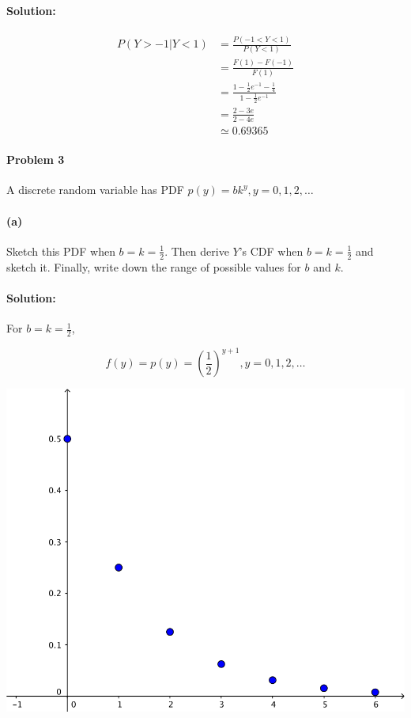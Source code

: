\documentclass[a4paper, 11pt, twoside]{article}
\begin{document}
\paragraph{Solution:}

\[
\begin{split}
	P(Y>-1|Y<1)&=\frac{P(-1<Y<1)}{P(Y<1)}\\
	&=\frac{F(1)-F(-1)}{F(1)}\\
	&=\frac{1-\frac{1}{2}e^{-1}-\frac{1}{4}}{1-\frac{1}{2}e^{-1}}\\
	&=\frac{2-3e}{2-4e}\\
	&\simeq 0.69365
\end{split}
\]

\paragraph{Problem 3} A discrete random variable has PDF $p(y)=bk^y, y=0,1,2,\dots$

\paragraph{(a)} Sketch this PDF when $b=k=\frac{1}{2}$. Then derive $Y$'s CDF when $b=k=\frac{1}{2}$ and sketch it. Finally, write down the range of possible values for $b$ and $k$.

\paragraph{Solution:} For $b=k=\frac12$, 

\[f(y)=p(y)=\left(\frac12\right)^{y+1}, y=0,1,2,\dots\]

\includegraphics{image/3a-pdf}
\end{document}
